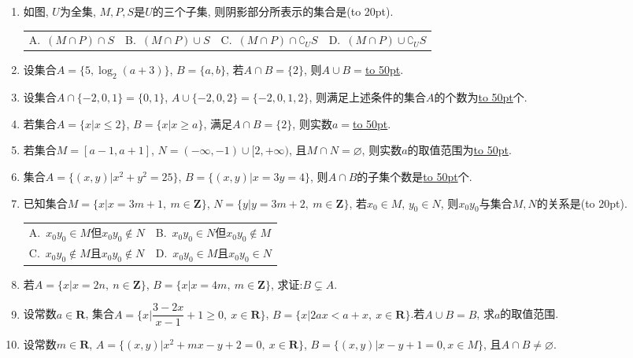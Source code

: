 \documentclass[10pt,a4paper]{article}
\newcommand{\blank}[1]{\underline{\hbox to #1pt{}}}
\newcommand{\bracket}[1]{(\hbox to #1pt{})}
\newcommand{\twoch}[4]{\par\begin{tabular}{p{.46\textwidth}p{.46\textwidth}}
A.~#1& B.~#2\\
C.~#3& D.~#4
\end{tabular}}
\newcommand{\fourch}[4]{\par\begin{tabular}{p{.23\textwidth}p{.23\textwidth}p{.23\textwidth}p{.23\textwidth}}
A.~#1 &B.~#2& C.~#3& D.~#4
\end{tabular}}
\begin{document}
\begin{enumerate}[1.]
\item 如图, $U$为全集, $M,P,S$是$U$的三个子集, 则阴影部分所表示的集合是\bracket{20}.
\fourch{$(M\cap P)\cap S$}{$(M\cap P)\cup S$}{$(M\cap P)\cap \complement_U S$}{$(M\cap P)\cup \complement_U S$}
\begin{center}
\end{center}
\item 设集合$A=\{5,\log_2(a+3)\}$, $B=\{a,b\}$, 若$A\cap B=\{2\}$, 则$A\cup B=$\blank{50}.
\item 设集合$A\cap \{-2,0,1\}=\{0,1\}$, $A\cup \{-2,0,2\}=\{-2,0,1,2\}$, 则满足上述条件的集合$A$的个数为\blank{50}个.
\item 若集合$A=\{x|x\le 2\}$, $B=\{x|x\ge a\}$, 满足$A\cap B=\{2\}$, 则实数$a=$\blank{50}.
\item 若集合$M=[a-1,a+1]$, $N=(-\infty,-1)\cup [2,+\infty)$, 且$M\cap N=\varnothing$, 则实数$a$的取值范围为\blank{50}.
\item 集合$A=\{(x,y)|x^2+y^2=25\}$, $B=\{(x,y)|x=3y=4\}$, 则$A\cap B$的子集个数是\blank{50}个.
\item 已知集合$M=\{x|x=3m+1, \ m\in \mathbf{Z}\}$, $N=\{y|y=3m+2, \ m\in \mathbf{Z}\}$, 若$x_0\in M$, $y_0\in N$, 则$x_0y_0$与集合$M,N$的关系是\bracket{20}.
\twoch{$x_0y_0\in M$但$x_0y_0$$\notin N$}{$x_0y_0\in N$但$x_0y_0\notin M$}{$x_0y_0\notin M$且$x_0y_0\notin N$}{$x_0y_0$$\in M$且$x_0y_0\in N$}
\item 若$A=\{x|x=2n,\ n\in \mathbf{Z}\}$, $B=\{x|x=4m,\ m\in \mathbf{Z}\}$, 求证:$B\subsetneq A$.
\item 设常数$a\in \mathbf{R}$, 集合$A=\{x|\dfrac{3-2x}{x-1}+1 \ge 0, \ x\in \mathbf{R}\}$, $B=\{x|2ax<a+x, \ x\in \mathbf{R} \}$.若$A\cup B=B$, 求$a$的取值范围.
\item 设常数$m\in \mathbf{R}$, $A=\{(x,y)|x^2+mx-y+2=0,\ x\in \mathbf{R}\}$, $B=\{(x,y)|x-y+1=0, x\in M\}$, 且$A\cap B\ne\varnothing$.\\

\end{enumerate}
\end{document}
